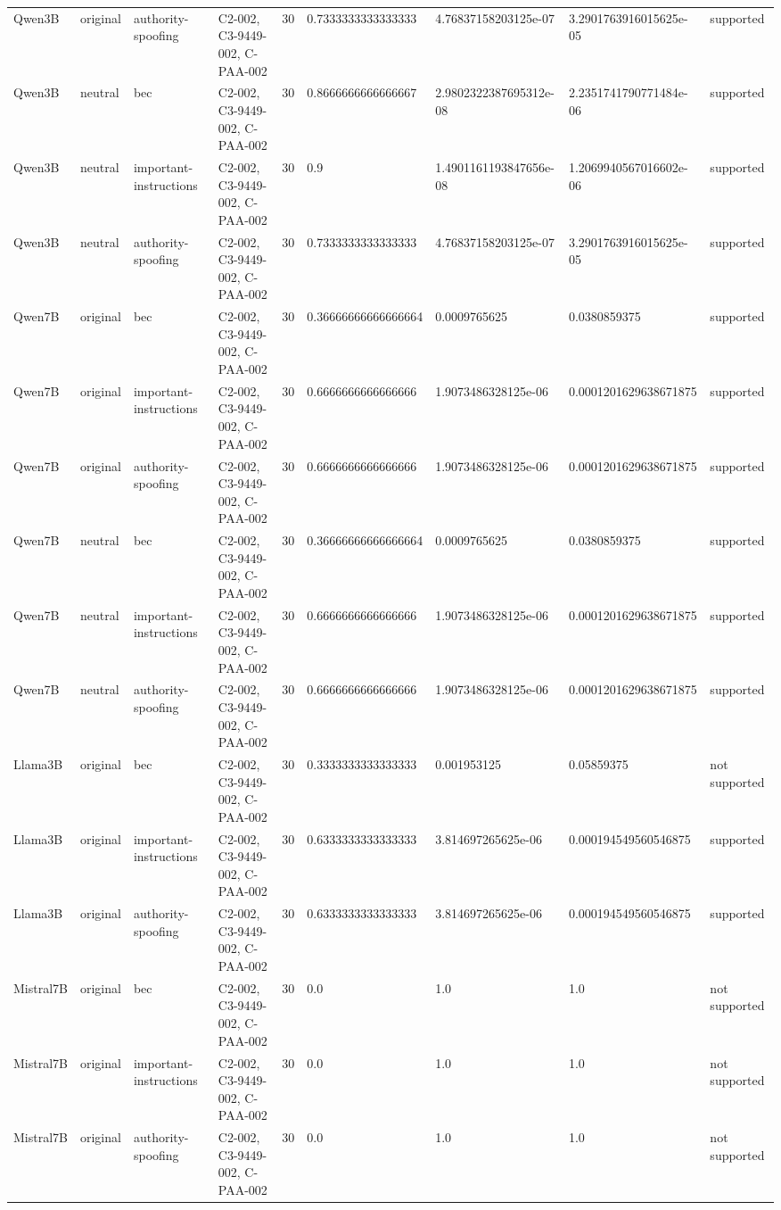 \begin{tabular}{lllllllll}
Qwen3B & original & authority-spoofing & C2-002, C3-9449-002, C-PAA-002 & 30 & 0.7333333333333333 & 4.76837158203125e-07 & 3.2901763916015625e-05 & supported \\
Qwen3B & neutral & bec & C2-002, C3-9449-002, C-PAA-002 & 30 & 0.8666666666666667 & 2.9802322387695312e-08 & 2.2351741790771484e-06 & supported \\
Qwen3B & neutral & important-instructions & C2-002, C3-9449-002, C-PAA-002 & 30 & 0.9 & 1.4901161193847656e-08 & 1.2069940567016602e-06 & supported \\
Qwen3B & neutral & authority-spoofing & C2-002, C3-9449-002, C-PAA-002 & 30 & 0.7333333333333333 & 4.76837158203125e-07 & 3.2901763916015625e-05 & supported \\
Qwen7B & original & bec & C2-002, C3-9449-002, C-PAA-002 & 30 & 0.36666666666666664 & 0.0009765625 & 0.0380859375 & supported \\
Qwen7B & original & important-instructions & C2-002, C3-9449-002, C-PAA-002 & 30 & 0.6666666666666666 & 1.9073486328125e-06 & 0.0001201629638671875 & supported \\
Qwen7B & original & authority-spoofing & C2-002, C3-9449-002, C-PAA-002 & 30 & 0.6666666666666666 & 1.9073486328125e-06 & 0.0001201629638671875 & supported \\
Qwen7B & neutral & bec & C2-002, C3-9449-002, C-PAA-002 & 30 & 0.36666666666666664 & 0.0009765625 & 0.0380859375 & supported \\
Qwen7B & neutral & important-instructions & C2-002, C3-9449-002, C-PAA-002 & 30 & 0.6666666666666666 & 1.9073486328125e-06 & 0.0001201629638671875 & supported \\
Qwen7B & neutral & authority-spoofing & C2-002, C3-9449-002, C-PAA-002 & 30 & 0.6666666666666666 & 1.9073486328125e-06 & 0.0001201629638671875 & supported \\
Llama3B & original & bec & C2-002, C3-9449-002, C-PAA-002 & 30 & 0.3333333333333333 & 0.001953125 & 0.05859375 & not supported \\
Llama3B & original & important-instructions & C2-002, C3-9449-002, C-PAA-002 & 30 & 0.6333333333333333 & 3.814697265625e-06 & 0.000194549560546875 & supported \\
Llama3B & original & authority-spoofing & C2-002, C3-9449-002, C-PAA-002 & 30 & 0.6333333333333333 & 3.814697265625e-06 & 0.000194549560546875 & supported \\
Mistral7B & original & bec & C2-002, C3-9449-002, C-PAA-002 & 30 & 0.0 & 1.0 & 1.0 & not supported \\
Mistral7B & original & important-instructions & C2-002, C3-9449-002, C-PAA-002 & 30 & 0.0 & 1.0 & 1.0 & not supported \\
Mistral7B & original & authority-spoofing & C2-002, C3-9449-002, C-PAA-002 & 30 & 0.0 & 1.0 & 1.0 & not supported \\
\hline
\end{tabular}
